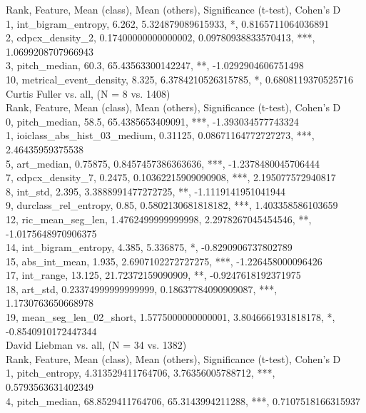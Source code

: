 Rank, Feature, Mean (class), Mean (others), Significance (t-test), Cohen's D\\
1, int_bigram_entropy, 6.262, 5.324879089615933, *, 0.8165711064036891\\
2, cdpcx_density_2, 0.17400000000000002, 0.09780938833570413, ***, 1.0699208707966943\\
3, pitch_median, 60.3, 65.43563300142247, **, -1.0292904606751498\\
10, metrical_event_density, 8.325, 6.3784210526315785, *, 0.6808119370525716\\
Curtis Fuller vs. all, (N = 8 vs. 1408)\\
Rank, Feature, Mean (class), Mean (others), Significance (t-test), Cohen's D\\
0, pitch_median, 58.5, 65.4385653409091, ***, -1.393034577743324\\
1, ioiclass_abs_hist_03_medium, 0.31125, 0.08671164772727273, ***, 2.46435959375538\\
5, art_median, 0.75875, 0.8457457386363636, ***, -1.2378480045706444\\
7, cdpcx_density_7, 0.2475, 0.10362215909090908, ***, 2.195077572940817\\
8, int_std, 2.395, 3.3888991477272725, **, -1.1119141951041944\\
9, durclass_rel_entropy, 0.85, 0.5802130681818182, ***, 1.403358586103659\\
12, ric_mean_seg_len, 1.4762499999999998, 2.2978267045454546, **, -1.0175648970906375\\
14, int_bigram_entropy, 4.385, 5.336875, *, -0.8290906737802789\\
15, abs_int_mean, 1.935, 2.6907102272727275, ***, -1.226458000096426\\
17, int_range, 13.125, 21.72372159090909, **, -0.9247618192371975\\
18, art_std, 0.23374999999999999, 0.18637784090909087, ***, 1.1730763650668978\\
19, mean_seg_len_02_short, 1.5775000000000001, 3.8046661931818178, *, -0.8540910172447344\\
David Liebman vs. all, (N = 34 vs. 1382)\\
Rank, Feature, Mean (class), Mean (others), Significance (t-test), Cohen's D\\
1, pitch_entropy, 4.313529411764706, 3.76356005788712, ***, 0.5793563631402349\\
4, pitch_median, 68.8529411764706, 65.3143994211288, ***, 0.7107518166315937\\
